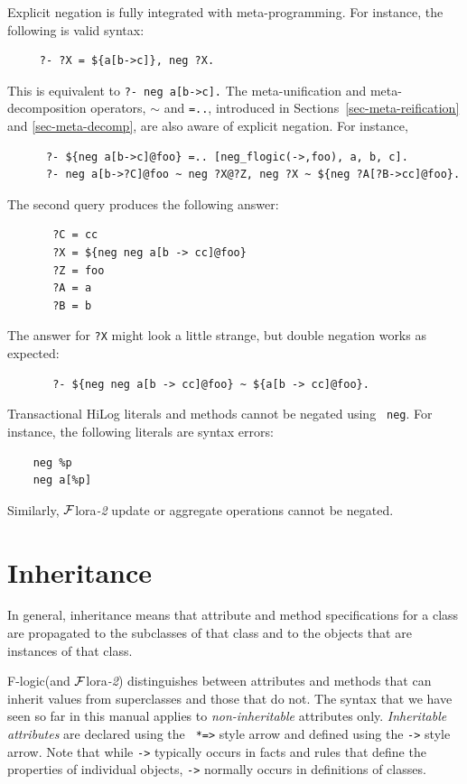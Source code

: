 \documentclass[11pt]{article}
\newcommand{\FLORA}{{\mbox{\sc ${\cal F}${lora}\rm\emph{-2}}}\xspace}
\newcommand{\fl}{\mbox{F-logic}\xspace}
\begin{document}
Explicit negation is fully integrated with meta-programming. For instance,
the following is valid syntax:
\begin{verbatim}
     ?- ?X = ${a[b->c]}, neg ?X.
\end{verbatim}
This is equivalent to \verb|?- neg a[b->c].|  The meta-unification and
meta-decomposition operators, {\tt $\sim$} and {\tt =..}, introduced in
Sections~\ref{sec-meta-reification} and \ref{sec-meta-decomp}, are
also aware of explicit negation. For instance, 
\begin{verbatim}
      ?- ${neg a[b->c]@foo} =.. [neg_flogic(->,foo), a, b, c].
      ?- neg a[b->?C]@foo ~ neg ?X@?Z, neg ?X ~ ${neg ?A[?B->cc]@foo}.
\end{verbatim}
The second query produces the following answer:
\begin{verbatim}
       ?C = cc
       ?X = ${neg neg a[b -> cc]@foo}
       ?Z = foo
       ?A = a
       ?B = b
\end{verbatim}
The answer for {\tt ?X} might look a little strange, but double negation
works as expected:
\begin{verbatim}
       ?- ${neg neg a[b -> cc]@foo} ~ ${a[b -> cc]@foo}.
\end{verbatim}

Transactional HiLog literals and methods cannot be negated using {\tt
  neg}. For instance, the following literals are syntax errors:
\begin{verbatim}
    neg %p
    neg a[%p]
\end{verbatim}
Similarly, \FLORA update or aggregate operations cannot be negated.


\section{Inheritance}\label{sec-inheritance}

In general, inheritance means that attribute and method specifications for
a class are propagated to the subclasses of that class and to the objects
that are instances of that class.

\fl (and \FLORA) distinguishes between attributes and methods that can
inherit values from superclasses and those that do not. The syntax that we
have seen so far in this manual applies to \emph{non-inheritable}
attributes only.  \emph{Inheritable attributes} are declared using the {\tt
  *=>} style arrow and defined using the {\tt *->}
  style arrow.  Note that while {\tt ->} typically
occurs in facts and rules that define the properties of individual objects,
{\tt *->} normally occurs in definitions of classes.
\end{document}

